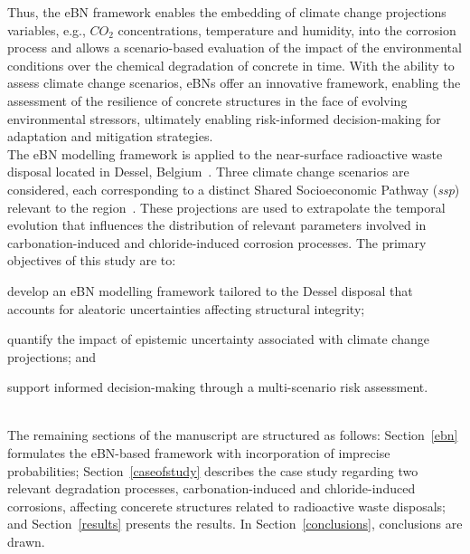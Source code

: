 Thus, the eBN framework enables the embedding of climate change projections variables, e.g., $CO_2$ concentrations, temperature and humidity, into the corrosion process and allows a scenario-based evaluation of the impact of the environmental conditions over the chemical degradation of concrete in time.
With the ability to assess climate change scenarios, eBNs offer an innovative framework, enabling the assessment of the resilience of concrete structures in the face of evolving environmental stressors, ultimately enabling risk-informed decision-making for adaptation and mitigation strategies.\\

The eBN modelling framework is applied to the near-surface radioactive waste disposal located in Dessel, Belgium~\cite{tosoni_comprehensiveness_2019-1}.
Three climate change scenarios are considered, each corresponding to a distinct Shared Socioeconomic Pathway (\textit{ssp}) relevant to the region~\cite{CMIP6}.
These projections are used to extrapolate the temporal evolution that influences the distribution of relevant parameters involved in carbonation-induced and chloride-induced corrosion processes.
The primary objectives of this study are to: 
\begin{enumerate*}[label=\roman*)]
    \item  develop an eBN modelling framework tailored to the Dessel disposal that accounts for aleatoric uncertainties affecting structural integrity;
    \item quantify the impact of epistemic uncertainty associated with climate change projections; and
    \item support informed decision-making through a multi-scenario risk assessment.
\end{enumerate*}
\\

The remaining sections of the manuscript are structured as follows: Section~\ref{ebn} formulates the eBN-based framework with incorporation of imprecise probabilities; Section~\ref{caseofstudy} describes the case study regarding two relevant degradation processes, carbonation-induced and chloride-induced corrosions, affecting concerete structures related to radioactive waste disposals; and Section~\ref{results} presents the results. In Section~\ref{conclusions}, conclusions are drawn.

